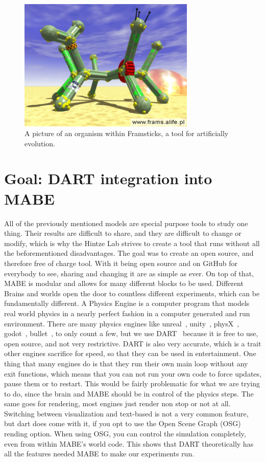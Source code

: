 \documentclass[12pt,oneside,listof=totoc,paper=a4,headings=small]{scrbook}
\begin{document}
\begin{figure}[h!]
\centering
\includegraphics[width=0.75\textwidth,height=0.75\textheight,keepaspectratio]{images/slideD1.jpg}
\caption{A picture of an organism within Framsticks, a tool for artificially evolution.~\cite{frampic}}
\label{fig:Framsticks}
\end{figure}

\section{Goal: DART integration into MABE}
All of the previously mentioned models are special purpose tools to study one thing. Their results are difficult to share, and they are difficult to change or modify, which is why the Hintze Lab strives to create a tool that runs without all the beforementioned disadvantages. The goal was to create an open source, and therefore free of charge tool. With it being open source and on GitHub for everybody to see, sharing and changing it are as simple as ever. On top of that, MABE is modular and allows for many different blocks to be used. Different Brains and worlds open the door to countless different experiments, which can be fundamentally different.
\newpage
A Physics Engine is a computer program that models real world physics in a nearly perfect fashion in a computer generated and run environment. 
There are many physics engines like unreal~\cite{unrealengine}, unity~\cite{unityengine}, physX~\cite{physxengine}, godot~\cite{linietsky2007godot}, bullet~\cite{coumans2013bullet}, to only count a few, but we use DART~\cite{lee2018dart} because it is free to use, open source, and not very restrictive. DART is also very accurate, which is a trait other engines sacrifice for speed, so that they can be used in entertainment. One thing that many engines do is that they run their own main loop without any exit functions, which means that you can not run your own code to force updates,  pause them or to restart. This would be fairly problematic for what we are trying to do, since the brain and MABE should be in control of the physics steps. The same goes for rendering, most engines just render non stop or not at all. Switching between visualization and text-based is not a very common feature, but dart does come with it, if you opt to use the Open Scene Graph (OSG) rending option. When using OSG, you can control the simulation completely, even from within MABE's world code. 
This shows that DART theoretically has all the features needed MABE to make our experiments run.
\end{document}

